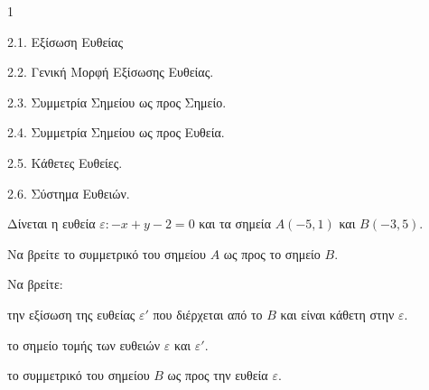 \begin{ylh}{1}
    \item 2.1. Εξίσωση Ευθείας
    \item 2.2. Γενική Μορφή Εξίσωσης Ευθείας.
    \item 2.3. Συμμετρία Σημείου ως προς Σημείο.
    \item 2.4. Συμμετρία Σημείου ως προς Ευθεία.
    \item 2.5. Κάθετες Ευθείες.
    \item 2.6. Σύστημα Ευθειών.
\end{ylh}
Δίνεται η ευθεία $\varepsilon: - x + y - 2 = 0$ και τα σημεία $A(-5,1)$ και $B(-3,5)$.
\begin{alist}
    \item Να βρείτε το συμμετρικό του σημείου $A$ ως προς το σημείο $B$. 
    \item Να βρείτε:
    \begin{rlist}
        \item την εξίσωση της ευθείας $\varepsilon'$ που διέρχεται από το $B$ και είναι κάθετη στην $\varepsilon$. 
        \item το σημείο τομής των ευθειών $\varepsilon$ και $\varepsilon'$. 
        \item το συμμετρικό του σημείου $B$ ως προς την ευθεία $\varepsilon$. 
    \end{rlist}
\end{alist}